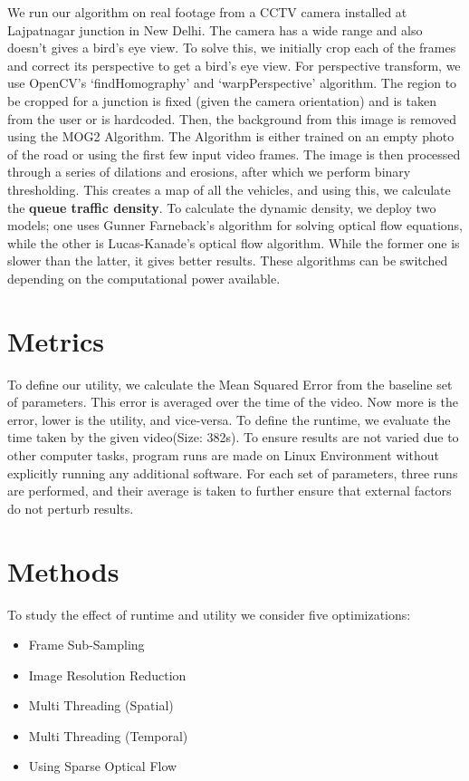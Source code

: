\documentclass[conference]{IEEEtran}
\begin{document}
We run our algorithm on real footage from a CCTV camera installed at Lajpatnagar junction in New Delhi. \cite{b1}
The camera has a wide range and also doesn't gives a bird's eye view. To solve this, we initially crop each of the frames and correct its perspective to get a bird's eye view. 
For perspective transform, we use OpenCV's `findHomography' and `warpPerspective' algorithm. \cite{b2}
The region to be cropped for a junction is fixed (given the camera orientation) and is taken from the user or is hardcoded.
Then, the background from this image is removed using the MOG2 Algorithm. The Algorithm is either trained on an empty photo of the road or using the first few input video frames.
The image is then processed through a series of dilations and erosions, after which we perform binary thresholding. This creates a map of all the vehicles, and using this, we calculate the {\bfseries{queue traffic density}}. 
To calculate the dynamic density, we deploy two models; one uses Gunner Farneback's algorithm for solving optical flow equations, while the other is Lucas-Kanade's optical flow algorithm. \cite{b4} \cite{b5}
While the former one is slower than the latter, it gives better results. These algorithms can be switched depending on the computational power available.

\section{Metrics}

To define our utility, we calculate the Mean Squared Error from the baseline set of parameters. This error is averaged over the time of the video. Now more is the error, lower is the utility, and vice-versa.
To define the runtime, we evaluate the time taken by the given video(Size: 382s). To ensure results are not varied due to other computer tasks, 
program runs are made on Linux Environment without explicitly running any additional software. For each set of parameters, three runs are performed, and their average is taken to further ensure that external factors do not perturb results.
\section{Methods}

To study the effect of runtime and utility we consider five optimizations:
\begin{itemize}
    \item Frame Sub-Sampling
    \item Image Resolution Reduction
    \item Multi Threading (Spatial)
    \item Multi Threading (Temporal)
    \item Using Sparse Optical Flow
\end{itemize}
\end{document}
